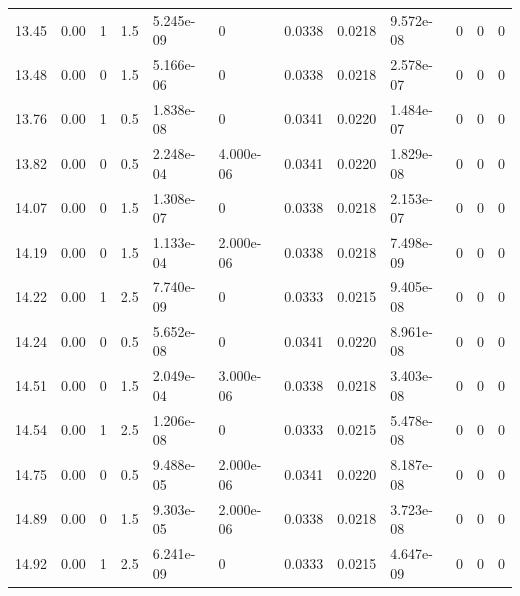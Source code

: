 \documentclass[preview]{standalone}
\begin{document}
{{{\begin{tabular}{L{1.2cm}C{1.2cm} C{0.3cm}C{0.5cm} C{1.4cm}C{1.4cm} C{1.4cm}C{1.4cm} C{1.6cm}C{1.6cm} C{1.6cm}C{1.6cm}}
  13.45  &  0.00  & 1     & 1.5 &  5.245e-09  & 0  &  0.0338&   0.0218& 9.572e-08 & 0   &  0 & 0  \\ 
  13.48  &  0.00  & 0     & 1.5 &  5.166e-06  & 0  &  0.0338&   0.0218& 2.578e-07 & 0   &  0 & 0  \\ 
  13.76  &  0.00  & 1     & 0.5 &  1.838e-08  & 0  &  0.0341&   0.0220& 1.484e-07 & 0   &  0 & 0  \\ 
  13.82  &  0.00  & 0     & 0.5 &  2.248e-04  & 4.000e-06  &  0.0341&   0.0220& 1.829e-08 & 0   &  0 & 0  \\ 
  14.07  &  0.00  & 0     & 1.5 &  1.308e-07  & 0  &  0.0338&   0.0218& 2.153e-07 & 0   &  0 & 0  \\ 
  14.19  &  0.00  & 0     & 1.5 &  1.133e-04  & 2.000e-06  &  0.0338&   0.0218& 7.498e-09 & 0   &  0 & 0  \\ 
  14.22  &  0.00  & 1     & 2.5 &  7.740e-09  & 0  &  0.0333&   0.0215& 9.405e-08 & 0   &  0 & 0  \\ 
  14.24  &  0.00  & 0     & 0.5 &  5.652e-08  & 0  &  0.0341&   0.0220& 8.961e-08 & 0   &  0 & 0  \\ 
  14.51  &  0.00  & 0     & 1.5 &  2.049e-04  & 3.000e-06  &  0.0338&   0.0218& 3.403e-08 & 0   &  0 & 0  \\ 
  14.54  &  0.00  & 1     & 2.5 &  1.206e-08  & 0  &  0.0333&   0.0215& 5.478e-08 & 0   &  0 & 0  \\ 
  14.75  &  0.00  & 0     & 0.5 &  9.488e-05  & 2.000e-06  &  0.0341&   0.0220& 8.187e-08 & 0   &  0 & 0  \\ 
  14.89  &  0.00  & 0     & 1.5 &  9.303e-05  & 2.000e-06  &  0.0338&   0.0218& 3.723e-08 & 0   &  0 & 0  \\ 
  14.92  &  0.00  & 1     & 2.5 &  6.241e-09  & 0  &  0.0333&   0.0215& 4.647e-09 & 0   &  0 & 0  \\ 
\hline 
\end{tabular} 

}}}
\end{document}
